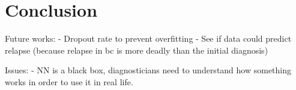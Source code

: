 \section{Conclusion}\label{sec:conclusion}

Future works: 
- Dropout rate to prevent overfitting
- See if data could predict relapse (because relapse in bc is more deadly than the initial diagnosis)

Issues: 
- NN is a black box, diagnosticians need to understand how something works in order to use it in real life.
